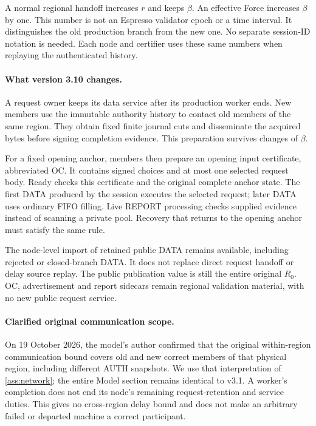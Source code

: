 \documentclass[11pt,a4paper]{article}
\begin{document}
A normal regional handoff increases $r$ and keeps $\beta$.
An effective Force increases $\beta$ by one. This number is not an
Espresso validator epoch or a time interval. It distinguishes the old
production branch from the new one. No separate session-ID notation is
needed. Each node and certifier uses these same numbers when replaying
the authenticated history.

\paragraph{What version 3.10 changes.}
A request owner keeps its data service after its production worker ends.
New members use the immutable authority history to contact old members
of the same region. They obtain fixed finite journal cuts and disseminate
the acquired bytes before signing completion evidence. This preparation
survives changes of $\beta$.

For a fixed opening anchor, members then prepare an opening input
certificate, abbreviated OC. It contains signed choices and at most one
selected request body. Ready checks this certificate and the original
complete anchor state. The first DATA produced by the session executes
the selected request; later DATA uses ordinary FIFO filling. Live REPORT
processing checks supplied evidence instead of scanning a private pool.
Recovery that returns to the opening anchor must satisfy the same rule.

The node-level import of retained public DATA remains available, including
rejected or closed-branch DATA. It does not replace direct request handoff
or delay source replay. The public publication value is still the entire
original $R_0$. OC, advertisement and report sidecars remain regional
validation material, with no new public request service.

\paragraph{Clarified original communication scope.}
On 19 October 2026, the model's author confirmed that the original
within-region communication bound covers old and new correct members
of that physical region, including different AUTH snapshots. We use
that interpretation of \cref{ass:network}; the entire Model section
remains identical to v3.1. A worker's completion does not end its node's
remaining request-retention and service duties. This gives no
cross-region delay bound and does not make an arbitrary failed or
departed machine a correct participant.
\end{document}
